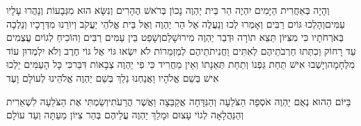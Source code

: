 \documentclass[../main/main.tex]{subfiles}
\begin{document}
\begin{multicols}{\ncols}
וְהָיָה בְּאַחֲרִית הַיָּמִים יִהְיֶה הַר בֵּית יַהְוֶה נָכוֹן בְּרֹאשׁ הֶהָרִים וְנִשָּׂא הוּא מִגְּבָעוֹת וְנָהֲרוּ עָלָיו עַמִּים\PreVerseSpace{}וְהָלְכוּ גּוֹיִם רַבִּים וְאָמְרוּ לְכוּ וְנַעֲלֶה אֶל הַר יַהְוֶה וְאֶל בֵּית אֱלֹהֵי יַעֲקֹב וְיוֹרֵנוּ מִדְּרָכָיו וְנֵלְכָה בְּאֹרְחֹתָיו כִּי מִצִּיּוֹן תֵּצֵא תוֹרָה וּדְבַר יַהְוֶה מִירוּשָׁלֵם\PreVerseSpace{}וְשָׁפַט בֵּין עַמִּים רַבִּים וְהוֹכִיחַ לְגוֹיִם עֲצֻמִים עַד רָחוֹק וְכִתְּתוּ חַרְבֹתֵיהֶם לְאִתִּים וַחֲנִיתֹתֵיהֶם לְמַזְמֵרוֹת לֹא יִשְׂאוּ גּוֹי אֶל גּוֹי חֶרֶב וְלֹא יִלְמְדוּן עוֹד מִלְחָמָה\PreVerseSpace{}וְיָשְׁבוּ אִישׁ תַּחַת גַּפְנוֹ וְתַחַת תְּאֵנָתוֹ וְאֵין מַחֲרִיד כִּי פִי יַהְוֶה צְבָאוֹת דִּבֵּר\PreVerseSpace{}כִּי כָּל הָעַמִּים יֵלְכוּ אִישׁ בְּשֵׁם אֱלֹהָיו וַאֲנַחְנוּ נֵלֵךְ בְּשֵׁם יַהְוֶה אֱלֹהֵינוּ לְעוֹלָם וָעֶד\OpenSection{}\par
{}בַּיּוֹם הַהוּא נְאֻם יַהְוֶה אֹסְפָה הַצֹּלֵעָה וְהַנִּדָּחָה אֲקַבֵּצָה וַאֲשֶׁר הֲרֵעֹתִי\PreVerseSpace{}וְשַׂמְתִּי אֶת הַצֹּלֵעָה לִשְׁאֵרִית וְהַנַּהֲלָאָה לְגוֹי עָצוּם וּמָלַךְ יַהְוֶה עֲלֵיהֶם בְּהַר צִיּוֹן מֵעַתָּה וְעַד עוֹלָם\OpenSection{}\par

\end{multicols}
\end{document}
